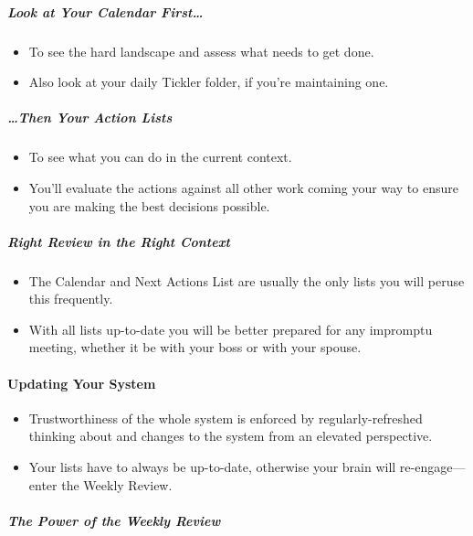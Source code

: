 \documentclass{article}
\begin{document}
\subparagraph{Look at Your Calendar First\ldots}

\begin{itemize}
  \item To see the hard landscape and assess what needs to get done.
  \item Also look at your daily Tickler folder, if you're maintaining one.
\end{itemize}

\subparagraph{\ldots Then Your Action Lists}

\begin{itemize}
  \item To see what you can do in the current context.
  \item You'll evaluate the actions against all other work coming your way to ensure you are making the best decisions possible.
\end{itemize}

\subparagraph{Right Review in the Right Context}

\begin{itemize}
  \item The Calendar and Next Actions List are usually the only lists you will peruse this frequently.
  \item With all lists up-to-date you will be better prepared for any impromptu meeting, whether it be with your boss or with your spouse.
\end{itemize}

\paragraph{Updating Your System}

\begin{itemize}
  \item Trustworthiness of the whole system is enforced by regularly-refreshed thinking about and changes to the system from an elevated perspective.
  \item Your lists have to always be up-to-date, otherwise your brain will re-engage---enter the Weekly Review.
\end{itemize}

\subparagraph{The Power of the Weekly Review}
\end{document}
